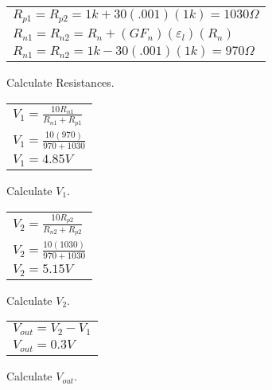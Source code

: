 \documentclass{article}
\begin{document}
\begin{enumerate}
\begin{figure}[h]
\begin{subtable}[b]{0.45\textwidth}
\begin{tabular}{ l }
		$R_{p1} = R_{p2} = 1k + 30(.001)(1k) = 1030\Omega$\\
		$R_{n1} = R_{n2} = R_n + (GF_n)(\varepsilon_l)(R_n)$\\
		$R_{n1} = R_{n2} = 1k - 30(.001)(1k) = 970\Omega$\\
	\end{tabular}
	\caption{Calculate Resistances.}
\end{subtable}
\begin{subtable}[b]{0.30\textwidth}
	\centering
	\begin{tabular}{ l }
		$V_{1} = \frac{10 R_{n1}}{R_{n1} + R_{p1}}$\\
		$V_{1} = \frac{10 (970)}{970 + 1030}$\\
		$V_{1} = 4.85V$\\
	\end{tabular}
	\caption{Calculate $V_{1}$.}
\end{subtable}
\begin{subtable}[b]{0.30\textwidth}
	\centering
	\begin{tabular}{ l }
		$V_{2} = \frac{10 R_{p2}}{R_{n2} + R_{p2}}$\\
		$V_{2} = \frac{10 (1030)}{970 + 1030}$\\
		$V_{2} = 5.15V$\\
	\end{tabular}
	\caption{Calculate $V_{2}$.}
\end{subtable}
\begin{subtable}[b]{0.30\textwidth}
	\centering
	\begin{tabular}{ l }
		$V_{out} = V_2 - V_1$\\
		$V_{out} = 0.3V$\\
	\end{tabular}
	\caption{Calculate $V_{out}$.}
\end{subtable}



\end{figure}

\end{enumerate}



\label{end}
\end{document}
